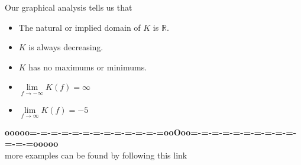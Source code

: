 \documentclass{ximera}
\begin{document}
\begin{example}
\begin{image}
\end{image}





Our graphical analysis tells us that

\begin{itemize}
\item The natural or implied domain of $K$ is $\mathbb{R}$.
\item $K$ is always decreasing.
\item $K$ has no maximums or minimums.
\item $\lim\limits_{f \to -\infty} K(f) = \infty$
\item $\lim\limits_{f \to \infty} K(f) = -5$
\end{itemize}


\end{example}












\begin{center}
\textbf{\textcolor{green!50!black}{ooooo=-=-=-=-=-=-=-=-=-=-=-=-=ooOoo=-=-=-=-=-=-=-=-=-=-=-=-=ooooo}} \\

more examples can be found by following this link\\ 

\end{center}
\end{document}
